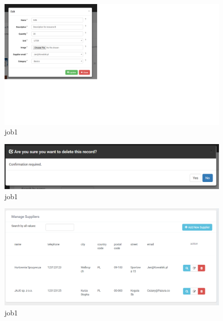 \documentclass[a4paper,11pt,twoside]{report}
\theoremstyle{definition}
\begin{document}
\begin{figure}[h!]
\begin{center}
\includegraphics[width=\textwidth]{AS/resources/4}
\end{center}
\caption{job1}
\end{figure}
\thispagestyle{empty}


\begin{figure}[h!]
\begin{center}
\includegraphics[width=\textwidth]{AS/resources/5}
\end{center}
\caption{job1}
\end{figure}
\thispagestyle{empty}


\begin{figure}[h!]
\begin{center}
\includegraphics[width=\textwidth]{AS/supplier/1}
\end{center}
\caption{job1}
\end{figure}
\thispagestyle{empty}
\end{document}
